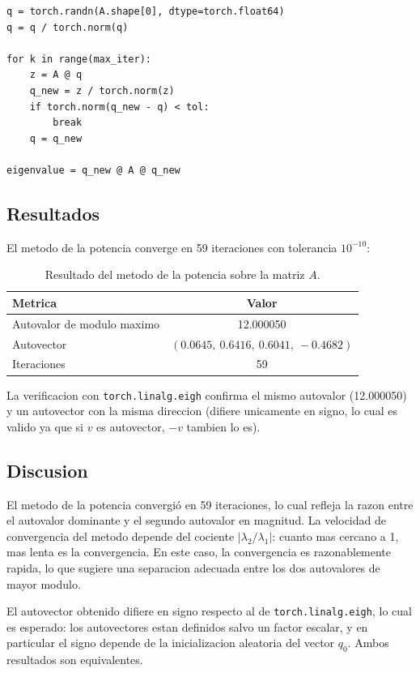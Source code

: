 \documentclass{article}
\begin{document}
\begin{lstlisting}
q = torch.randn(A.shape[0], dtype=torch.float64)
q = q / torch.norm(q)

for k in range(max_iter):
    z = A @ q
    q_new = z / torch.norm(z)
    if torch.norm(q_new - q) < tol:
        break
    q = q_new

eigenvalue = q_new @ A @ q_new
\end{lstlisting}

\subsection{Resultados}

El metodo de la potencia converge en 59 iteraciones con tolerancia $10^{-10}$:

\begin{table}[H]
\centering
\begin{tabular}{lc}
\hline
\textbf{Metrica} & \textbf{Valor} \\
\hline
Autovalor de modulo maximo & 12.000050 \\
Autovector & $(0.0645,\ 0.6416,\ 0.6041,\ -0.4682)$ \\
Iteraciones & 59 \\
\hline
\end{tabular}
\caption{Resultado del metodo de la potencia sobre la matriz $A$.}
\label{tab:p2_result}
\end{table}

La verificacion con \texttt{torch.linalg.eigh} confirma el mismo autovalor (12.000050) y un autovector con la misma direccion (difiere unicamente en signo, lo cual es valido ya que si $v$ es autovector, $-v$ tambien lo es).

\subsection{Discusion}

El metodo de la potencia convergió en 59 iteraciones, lo cual refleja la razon entre el autovalor dominante y el segundo autovalor en magnitud. La velocidad de convergencia del metodo depende del cociente $|\lambda_2 / \lambda_1|$: cuanto mas cercano a 1, mas lenta es la convergencia. En este caso, la convergencia es razonablemente rapida, lo que sugiere una separacion adecuada entre los dos autovalores de mayor modulo.

El autovector obtenido difiere en signo respecto al de \texttt{torch.linalg.eigh}, lo cual es esperado: los autovectores estan definidos salvo un factor escalar, y en particular el signo depende de la inicializacion aleatoria del vector $q_0$. Ambos resultados son equivalentes.
\end{document}
